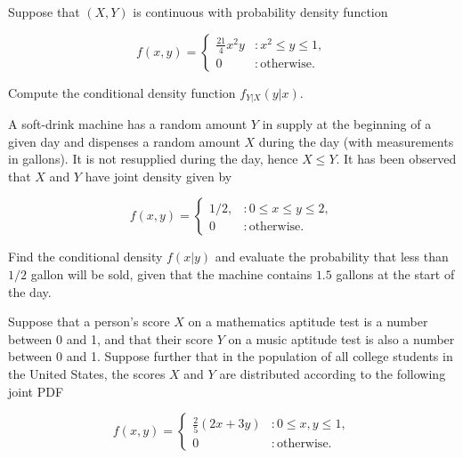 \documentclass[12pt,reqno]{amsart}
\begin{document}
\newpage
\prob Suppose that $(X,Y)$ is continuous with probability density function

\[f(x,y) = \begin{cases}
    \frac{21}{4}x^2 y & : x^2 \leq y \leq 1, \\
    0 & : \text{otherwise}.
\end{cases}\]

Compute the conditional density function $f_{Y|X}(y|x)$.\vfill














\bigskip
\prob A soft-drink machine has a random amount $Y$ in supply at the beginning of a given day and dispenses a random amount $X$ during the day (with measurements in gallons). It is not resupplied during the day, hence $X\leq Y$. It has been observed that $X$ and $Y$ have joint density given by

    \[f(x,y) = \begin{cases}
        1/2, & : 0 \leq x \leq y \leq 2, \\
        0 & : \text{otherwise}.
    \end{cases}\]

Find the conditional density $f(x|y)$ and evaluate the probability that less than $1/2$ gallon will be sold, given that the machine contains $1.5$ gallons at the start of the day.\vfill














\newpage
\prob Suppose that a person’s score $X$ on a mathematics aptitude test is a number between 0 and 1, and that their score $Y$ on a music aptitude test is also a number between 0 and 1. Suppose further that in the population of all college students in the United States, the scores $X$ and $Y$ are distributed according to the following joint PDF

	\[f(x,y) = \begin{cases}
	\frac{2}{5} (2x+3y) & : 0\leq x,y \leq 1, \\
	0 & : \text{otherwise}.
	\end{cases}
	\]
\end{document}

